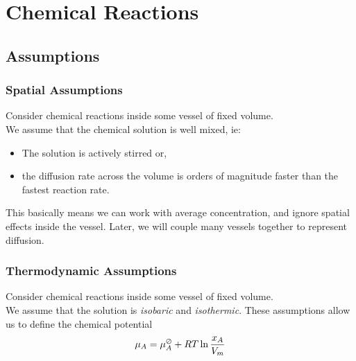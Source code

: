 \documentclass[11pt,reqno]{beamer}
\begin{document}
\section{Chemical Reactions}
\subsection{Assumptions}
\begin{frame}
\frametitle{Spatial Assumptions}
Consider chemical reactions inside some vessel of fixed volume.\\
We assume that the chemical solution is well mixed, ie:
\begin{itemize}
	\item The solution is actively stirred or,
	\item the diffusion rate across the volume is orders of magnitude faster than the fastest reaction rate.
\end{itemize}
\vfill
This basically means we can work with average concentration, and ignore spatial effects inside the vessel.
\vfill
Later, we will couple many vessels together to represent diffusion.
\end{frame}

\begin{frame}
\frametitle{Thermodynamic Assumptions}
Consider chemical reactions inside some vessel of fixed volume.\\
We assume that the solution is \emph{isobaric} and \emph{isothermic}.
These assumptions allow us to define the chemical potential
\[
\mu_A = \mu_A^\varoslash + RT\ln \frac{x_A}{V_m}
\]

\end{frame}
\end{document}
